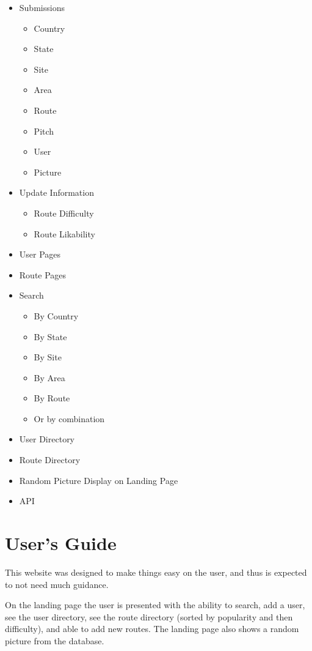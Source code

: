\documentclass[12pt,letter]{article}
\begin{document}
\begin{itemize}
    \item Submissions
        \begin{itemize}
            \item Country
            \item State
            \item Site
            \item Area
            \item Route
            \item Pitch
            \item User
            \item Picture
        \end{itemize}
    \item Update Information
        \begin{itemize}
            \item Route Difficulty
            \item Route Likability
        \end{itemize}
    \item User Pages
    \item Route Pages
    \item Search
        \begin{itemize}
            \item By Country
            \item By State
            \item By Site
            \item By Area
            \item By Route
            \item Or by combination
        \end{itemize}
    \item User Directory
    \item Route Directory
    \item Random Picture Display on Landing Page
    \item API
\end{itemize}

\section{User's Guide}\label{sec:ug}

This website was designed to make things easy on the user, and thus is expected
to not need much guidance. 

On the landing page the user is presented with the ability to search, add a
user, see the user directory, see the route directory (sorted by popularity and
then difficulty), and able to add new routes. The landing page also shows a
random picture from the database.
\end{document}
